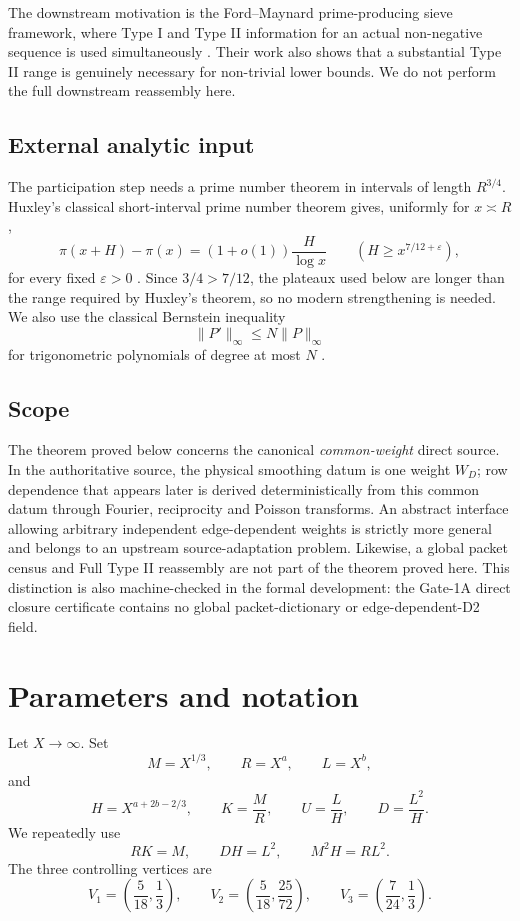\documentclass[11pt]{article}
\theoremstyle{definition}
\newcommand{\1}{\mathbf 1}
\begin{document}
The downstream motivation is the Ford--Maynard prime-producing sieve
framework, where Type I and Type II information for an actual non-negative
sequence is used simultaneously \cite{FordMaynard2024}. Their work also shows
that a substantial Type II range is genuinely necessary for non-trivial lower
bounds. We do not perform the full downstream reassembly here.

\subsection{External analytic input}
The participation step needs a prime number theorem in intervals of length
$R^{3/4}$.  Huxley's classical short-interval prime number theorem gives,
uniformly for $x\asymp R$,
\[
   \pi(x+H)-\pi(x)=(1+o(1))\frac{H}{\log x}
   \qquad(H\ge x^{7/12+\varepsilon}),
\]
for every fixed $\varepsilon>0$ \cite{Huxley1972}.  Since $3/4>7/12$, the
plateaux used below are longer than the range required by Huxley's theorem,
so no modern strengthening is needed.  We also use the classical Bernstein
inequality
\[
   \|P'\|_\infty\le N\|P\|_\infty
\]
for trigonometric polynomials of degree at most $N$ \cite{Zygmund2002}.

\subsection{Scope}
The theorem proved below concerns the canonical \emph{common-weight} direct
source.  In the authoritative source, the physical smoothing datum is one
weight $W_D$; row dependence that appears later is derived deterministically
from this common datum through Fourier, reciprocity and Poisson transforms.
An abstract interface allowing arbitrary independent edge-dependent weights
is strictly more general and belongs to an upstream source-adaptation problem.
Likewise, a global packet census and Full Type II reassembly are not part of
the theorem proved here.  This distinction is also machine-checked in the
formal development: the Gate-1A direct closure certificate contains no global
packet-dictionary or edge-dependent-D2 field.

\section{Parameters and notation}
Let $X\to\infty$. Set
\[
    M=X^{1/3},\qquad R=X^a,\qquad L=X^b,
\]
and
\[
    H=X^{a+2b-2/3},\qquad
    K=\frac{M}{R},\qquad
    U=\frac{L}{H},\qquad
    D=\frac{L^2}{H}.
\]
We repeatedly use
\begin{equation}
    RK=M,\qquad DH=L^2,\qquad M^2H=RL^2.
    \label{eq:scale-identities}
\end{equation}
The three controlling vertices are
\[
   V_1=\left(\frac{5}{18},\frac13\right),\qquad
   V_2=\left(\frac{5}{18},\frac{25}{72}\right),\qquad
   V_3=\left(\frac{7}{24},\frac13\right).
\]
\end{document}

